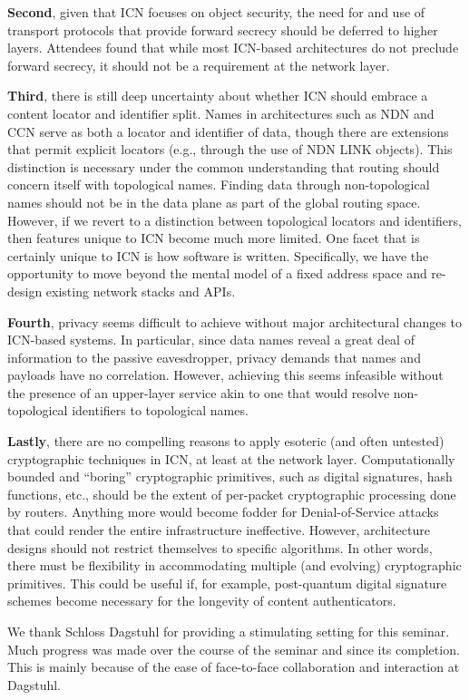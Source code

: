 \documentclass{sig-alternate-10pt}
\begin{document}
{\bf Second}, given that ICN focuses on object security, the need for and use of transport
protocols that provide forward secrecy should be deferred to higher layers. Attendees
found that while most ICN-based architectures do not preclude forward secrecy, it should
not be a requirement at the network layer.

{\bf Third}, there is still deep uncertainty about whether ICN should embrace a content
locator and identifier split. Names in architectures such as NDN and CCN serve as both a
locator and identifier of data, though there are extensions that permit explicit locators
(e.g., through the use of NDN LINK objects). This distinction is necessary under the
common understanding that routing should concern itself with topological names. Finding
data through non-topological names should not be in the data plane as part of the global
routing space. However, if we revert to a distinction between topological locators and
identifiers, then features unique to ICN become much more limited. One facet that is
certainly unique to ICN is how software is written. Specifically, we have the opportunity
to move beyond the mental model of a fixed address space and re-design existing network
stacks and APIs.

{\bf Fourth}, privacy seems difficult to achieve without major architectural changes to
ICN-based systems. In particular, since data names reveal a great deal of information to
the passive eavesdropper, privacy demands that names and payloads have no correlation.
However, achieving this seems infeasible without the presence of an upper-layer service
akin to one that would resolve non-topological identifiers to topological names.

{\bf Lastly}, there are no compelling reasons to apply esoteric (and often untested)
cryptographic techniques in ICN, at least at the network layer. Computationally bounded
and ``boring'' cryptographic primitives, such as digital signatures, hash functions, etc.,
should be the extent of per-packet cryptographic processing done by routers. Anything
more would become fodder for Denial-of-Service attacks that could render the entire
infrastructure ineffective. However, architecture designs should not restrict themselves
to specific algorithms. In other words, there must be flexibility in accommodating
multiple (and evolving) cryptographic primitives. This could be useful if, for example,
post-quantum digital signature schemes become necessary for the longevity of content authenticators.

We thank Schloss Dagstuhl for providing a stimulating setting for this seminar. Much
progress was made over the course of the seminar and since its completion. This is mainly
because of the ease of face-to-face collaboration and interaction at Dagstuhl.
\end{document}
